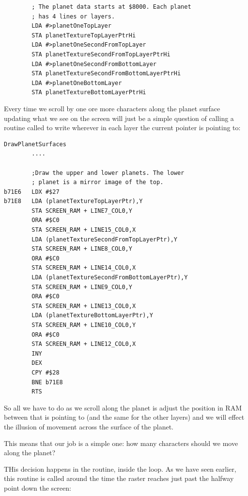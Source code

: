 \begin{lstlisting}
        ; The planet data starts at $8000. Each planet
        ; has 4 lines or layers.
        LDA #>planetOneTopLayer
        STA planetTextureTopLayerPtrHi
        LDA #>planetOneSecondFromTopLayer
        STA planetTextureSecondFromTopLayerPtrHi
        LDA #>planetOneSecondFromBottomLayer
        STA planetTextureSecondFromBottomLayerPtrHi
        LDA #>planetOneBottomLayer
        STA planetTextureBottomLayerPtrHi
\end{lstlisting}

Every time we scroll by one ore more characters along the planet surface updating what we see on the screen will
just be a simple question of calling a routine called  to write wherever in each layer
the current pointer is pointing to:

\begin{lstlisting}
DrawPlanetSurfaces
        ....

        ;Draw the upper and lower planets. The lower
        ; planet is a mirror image of the top.
b71E6   LDX #$27
b71E8   LDA (planetTextureTopLayerPtr),Y
        STA SCREEN_RAM + LINE7_COL0,Y
        ORA #$C0
        STA SCREEN_RAM + LINE15_COL0,X
        LDA (planetTextureSecondFromTopLayerPtr),Y
        STA SCREEN_RAM + LINE8_COL0,Y
        ORA #$C0
        STA SCREEN_RAM + LINE14_COL0,X
        LDA (planetTextureSecondFromBottomLayerPtr),Y
        STA SCREEN_RAM + LINE9_COL0,Y
        ORA #$C0
        STA SCREEN_RAM + LINE13_COL0,X
        LDA (planetTextureBottomLayerPtr),Y
        STA SCREEN_RAM + LINE10_COL0,Y
        ORA #$C0
        STA SCREEN_RAM + LINE12_COL0,X
        INY
        DEX
        CPY #$28
        BNE b71E8
        RTS
\end{lstlisting}

So all we have to do as we scroll along the planet is adjust the position in RAM between 
that   is pointing to (and the same for the other layers) and we will effect
the illusion of movement across the surface of the planet.

This means that our job is a simple one: how many characters should we move along the planet?

THis decision happens in the  routine, inside the  loop. As
we have seen earlier, this routine is called around the time the raster reaches just past the halfway point
down the screen:

